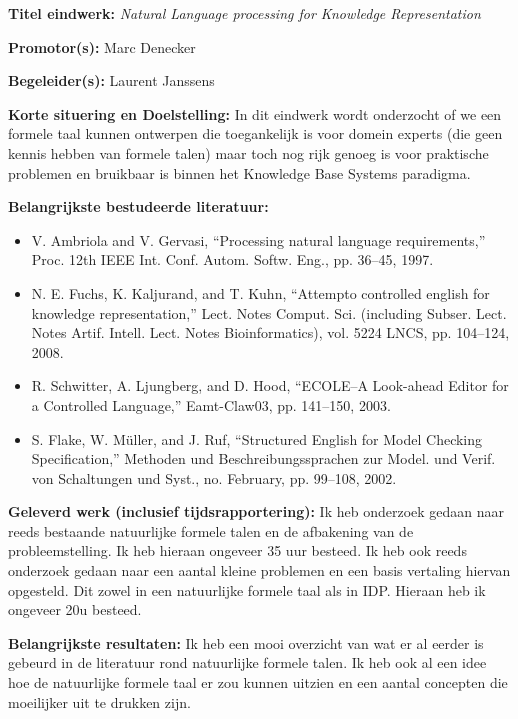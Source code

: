 \documentclass[12pt]{report}
\begin{document}
\pagestyle{myheadings}
{\bf Titel eindwerk:} {\em Natural Language processing for Knowledge Representation}

\vspace{0.5cm}
{\bf Promotor(s):} Marc Denecker


\vspace{0.5cm}
{\bf Begeleider(s):} Laurent Janssens

\vspace{1cm}
{\bf Korte situering en Doelstelling: } In dit eindwerk wordt onderzocht of we een formele taal kunnen ontwerpen die toegankelijk is voor domein experts (die geen kennis hebben van formele talen) maar toch nog rijk genoeg is voor praktische problemen en bruikbaar is binnen het Knowledge Base Systems paradigma.

\vspace{1cm}
{\bf Belangrijkste bestudeerde literatuur:}
\begin{itemize}
\item V. Ambriola and V. Gervasi, “Processing natural language requirements,” Proc. 12th IEEE Int. Conf. Autom. Softw. Eng., pp. 36–45, 1997.
\item N. E. Fuchs, K. Kaljurand, and T. Kuhn, “Attempto controlled english for knowledge representation,” Lect. Notes Comput. Sci. (including Subser. Lect. Notes Artif. Intell. Lect. Notes Bioinformatics), vol. 5224 LNCS, pp. 104–124, 2008.
\item R. Schwitter, A. Ljungberg, and D. Hood, “ECOLE–A Look-ahead Editor for a Controlled Language,” Eamt-Claw03, pp. 141–150, 2003.
\item S. Flake, W. Müller, and J. Ruf, “Structured English for Model Checking Specification,” Methoden und Beschreibungssprachen zur Model. und Verif. von Schaltungen und Syst., no. February, pp. 99–108, 2002.
\end{itemize}

\vspace{1cm}
{\bf Geleverd werk (inclusief tijdsrapportering):}
Ik heb onderzoek gedaan naar reeds bestaande natuurlijke formele talen en de afbakening van de probleemstelling. Ik heb hieraan ongeveer 35 uur besteed.
Ik heb ook reeds onderzoek gedaan naar een aantal kleine problemen en een basis vertaling hiervan opgesteld. Dit zowel in een natuurlijke formele taal als in IDP. Hieraan heb ik ongeveer 20u besteed.

\vspace{1cm}
{\bf Belangrijkste resultaten:}
Ik heb een mooi overzicht van wat er al eerder is gebeurd in de literatuur rond natuurlijke formele talen.
Ik heb ook al een idee hoe de natuurlijke formele taal er zou kunnen uitzien en een aantal concepten die moeilijker uit te drukken zijn.
\end{document}
